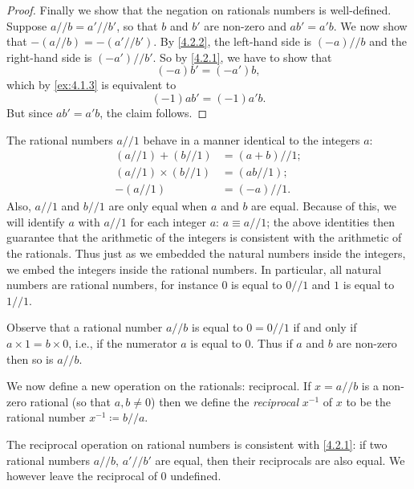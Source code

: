 \begin{proof}
  Finally we show that the negation on rationals numbers is well-defined.
  Suppose \(a // b = a' // b'\), so that \(b\) and \(b'\) are non-zero and \(ab' = a'b\).
  We now show that \(-(a // b) = -(a' // b')\).
  By \cref{4.2.2}, the left-hand side is \((-a) // b\) and the right-hand side is \((-a') // b'\).
  So by \cref{4.2.1}, we have to show that
  \[
    (-a)b' = (-a')b,
  \]
  which by \cref{ex:4.1.3} is equivalent to
  \[
    (-1)ab' = (-1)a'b.
  \]
  But since \(ab' = a'b\), the claim follows.
\end{proof}

\begin{note}
  The rational numbers \(a // 1\) behave in a manner identical to the integers \(a\):
  \begin{align*}
    (a // 1) + (b // 1)      & = (a + b) // 1; \\
    (a // 1) \times (b // 1) & = (ab // 1);    \\
    -(a // 1)                & = (-a) // 1.
  \end{align*}
  Also, \(a // 1\) and \(b // 1\) are only equal when \(a\) and \(b\) are equal.
  Because of this, we will identify \(a\) with \(a // 1\) for each integer \(a\): \(a \equiv a // 1\);
  the above identities then guarantee that the arithmetic of the integers is consistent with the arithmetic of the rationals.
  Thus just as we embedded the natural numbers inside the integers, we embed the integers inside the rational numbers.
  In particular, all natural numbers are rational numbers, for instance \(0\) is equal to \(0 // 1\) and \(1\) is equal to \(1 // 1\).
\end{note}

\begin{note}
  Observe that a rational number \(a // b\) is equal to \(0 = 0 // 1\) if and only if \(a \times 1 = b \times 0\), i.e., if the numerator \(a\) is equal to \(0\).
  Thus if \(a\) and \(b\) are non-zero then so is \(a // b\).
\end{note}

\begin{note}
  We now define a new operation on the rationals: reciprocal.
  If \(x = a // b\) is a non-zero rational (so that \(a, b \neq 0\)) then we define the \emph{reciprocal} \(x^{-1}\) of \(x\) to be the rational number \(x^{-1} \coloneqq b // a\).
\end{note}

\begin{ac}\label{ac:4.2.2}
  The reciprocal operation on rational numbers is consistent with \cref{4.2.1}:
  if two rational numbers \(a // b\), \(a' // b'\) are equal, then their reciprocals are also equal.
  We however leave the reciprocal of \(0\) undefined.
\end{ac}

